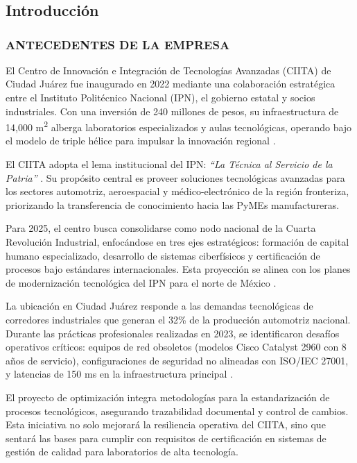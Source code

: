 \section{}
\subsection{Introducción}
\subsubsection{ANTECEDENTES DE LA EMPRESA}
El Centro de Innovación e Integración de Tecnologías Avanzadas (CIITA) de Ciudad Juárez fue inaugurado en 2022 mediante una colaboración estratégica entre el Instituto Politécnico Nacional (IPN), el gobierno estatal y socios industriales. Con una inversión de 240 millones de pesos, su infraestructura de 14,000 m\textsuperscript{2} alberga laboratorios especializados y aulas tecnológicas, operando bajo el modelo de triple hélice para impulsar la innovación regional \cite{ipn_inauguracion_citta_juarez}.

 \label{sec:1.1.1}
El CIITA adopta el lema institucional del IPN: \textit{``La Técnica al Servicio de la Patria''} \cite{ipn_organizacion}. Su propósito central es proveer soluciones tecnológicas avanzadas para los sectores automotriz, aeroespacial y médico-electrónico de la región fronteriza, priorizando la transferencia de conocimiento hacia las PyMEs manufactureras.

 \label{sec:1.1.2}
Para 2025, el centro busca consolidarse como nodo nacional de la Cuarta Revolución Industrial, enfocándose en tres ejes estratégicos: formación de capital humano especializado, desarrollo de sistemas ciberfísicos y certificación de procesos bajo estándares internacionales. Esta proyección se alinea con los planes de modernización tecnológica del IPN para el norte de México \cite{ipn_organizacion}.

La ubicación en Ciudad Juárez responde a las demandas tecnológicas de corredores industriales que generan el 32\% de la producción automotriz nacional. Durante las prácticas profesionales realizadas en 2023, se identificaron desafíos operativos críticos: equipos de red obsoletos (modelos Cisco Catalyst 2960 con 8 años de servicio), configuraciones de seguridad no alineadas con ISO/IEC 27001, y latencias de 150 ms en la infraestructura principal \cite{ipn_inauguracion_citta_juarez}.

El proyecto de optimización integra metodologías para la estandarización de procesos tecnológicos, asegurando trazabilidad documental y control de cambios. Esta iniciativa no solo mejorará la resiliencia operativa del CIITA, sino que sentará las bases para cumplir con requisitos de certificación en sistemas de gestión de calidad para laboratorios de alta tecnología.

